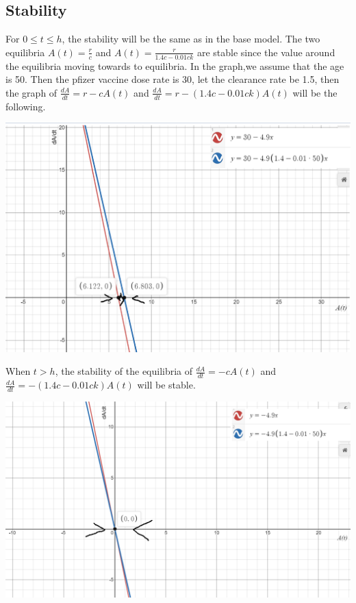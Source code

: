 \documentclass{article}
\begin{document}
\subsection*{Stability}
For $0 \leq t \leq h$, the stability will be the same as in the base model. The two equilibria $A(t)=\frac{r}{c}$ and $A(t)=\frac{r}{1.4c-0.01ck}$ are stable since the value around the equilibria moving towards to equilibria. In the graph,we assume that the age is 50. Then the pfizer vaccine dose rate is 30, let the clearance rate be 1.5, then the graph of $\frac{dA}{dt} =r-{c}A(t)$ and $\frac{dA}{dt} =r- (1.4c-0.01ck)A(t)$ will be the following.
\begin{center}
\includegraphics[scale = 0.43]{age graph 1.png}    
\end{center}


When $t > h$, the stability of the equilibria of $\frac{dA}{dt} =-{c}A(t)$ and $\frac{dA}{dt} =- (1.4c-0.01ck)A(t)$ will be stable.
\begin{center}
\includegraphics[scale = 0.43]{age graph 2.png}
    
\end{center}
\end{document}
